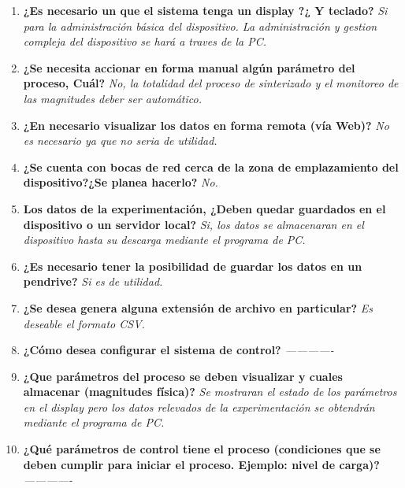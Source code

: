 \begin{enumerate}
\begin{enumerate}
	  \item \textbf{ ¿Es necesario un que el sistema tenga un display ?¿ Y teclado? }
		\subitem	\textit{ Si para la administración básica del dispositivo. La administración y gestion compleja del dispositivo se hará
					 a traves de la PC.
				}

	  \item \textbf{ ¿Se necesita accionar en forma manual algún parámetro del proceso, Cuál? }
		\subitem	\textit{ No, la totalidad del proceso de sinterizado y el monitoreo de las magnitudes deber ser automático.
				}

	  \item \textbf{ ¿En necesario visualizar los datos en forma remota (vía Web)? }
		\subitem	\textit{ No es necesario ya que no seria de utilidad.
				}

	  \item \textbf{ ¿Se cuenta con bocas de red cerca de la zona de emplazamiento del dispositivo?¿Se planea hacerlo? }
		\subitem	\textit{ No.
				} 

	  \item \textbf{ Los datos de la experimentación, ¿Deben quedar guardados en el dispositivo o un servidor local? }
		\subitem	\textit{ Si, los datos se almacenaran en el dispositivo hasta su descarga mediante el programa de PC.
				}

	  \item \textbf{ ¿Es necesario tener la posibilidad de guardar los datos en un pendrive? }
		\subitem	\textit{ Si es de utilidad.
				}

	  \item \textbf{ ¿Se desea genera alguna extensión de archivo en particular? }
		\subitem	\textit{ Es deseable el formato CSV.
				}

	  \item \textbf{ ¿Cómo desea configurar el sistema de control? }
		\subitem	\textit{ -------------
				}

	  \item \textbf{ ¿Que parámetros del proceso se deben visualizar y cuales almacenar (magnitudes física)? }
		\subitem	\textit{ Se mostraran el estado de los parámetros en el display pero los datos relevados de la experimentación se
					  obtendrán mediante el programa de PC.
				}

	  \item \textbf{ ¿Qué parámetros de control tiene el proceso (condiciones que se deben cumplir para iniciar el proceso. Ejemplo: nivel de carga)? }
		\subitem	\textit{ -------------
				}


\end{enumerate}
\end{enumerate}
